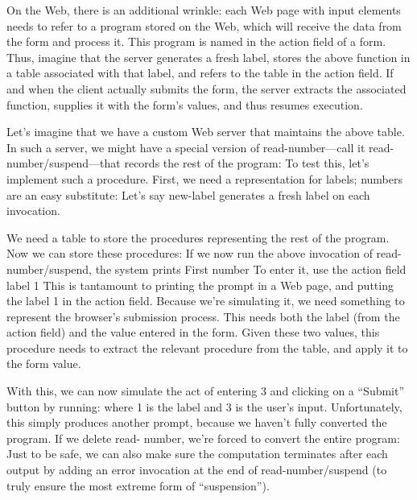 
On the Web, there is an additional wrinkle: each Web page with input elements
needs to refer to a program stored on the Web, which will receive the data from
the form and process it. This program is named in the action field of a form.
Thus, imagine that the server generates a fresh label, stores the above function
in a table associated with that label, and refers to the table in the action
field. If and when the client actually submits the form, the server extracts the
associated function, supplies it with the form’s values, and thus resumes
execution.


Let’s imagine that we have a custom Web server that maintains the above table.
In such a server, we might have a special version of read-number—call it read-
number/suspend—that records the rest of the program:
To test this, let’s implement such a procedure. First, we need a representation
for labels; numbers are an easy substitute:
Let’s say new-label generates a fresh label on each invocation.

We need a table to store the procedures representing the rest of the program.
Now we can store these procedures:
If we now run the above invocation of read-number/suspend, the system prints
First number To enter it, use the action field label 1 This is tantamount to
printing the prompt in a Web page, and putting the label 1 in the action field.
Because we’re simulating it, we need something to represent the browser’s
submission process. This needs both the label (from the action field) and the
value entered in the form. Given these two values, this procedure needs to
extract the relevant procedure from the table, and apply it to the form value.

With this, we can now simulate the act of entering 3 and clicking on a “Submit”
button by running:
where 1 is the label and 3 is the user’s input. Unfortunately, this simply
produces another prompt, because we haven’t fully converted the program. If we
delete read- number, we’re forced to convert the entire program:
Just to be safe, we can also make sure the computation terminates after each
output by adding an error invocation at the end of read-number/suspend (to truly
ensure the most extreme form of “suspension”).

